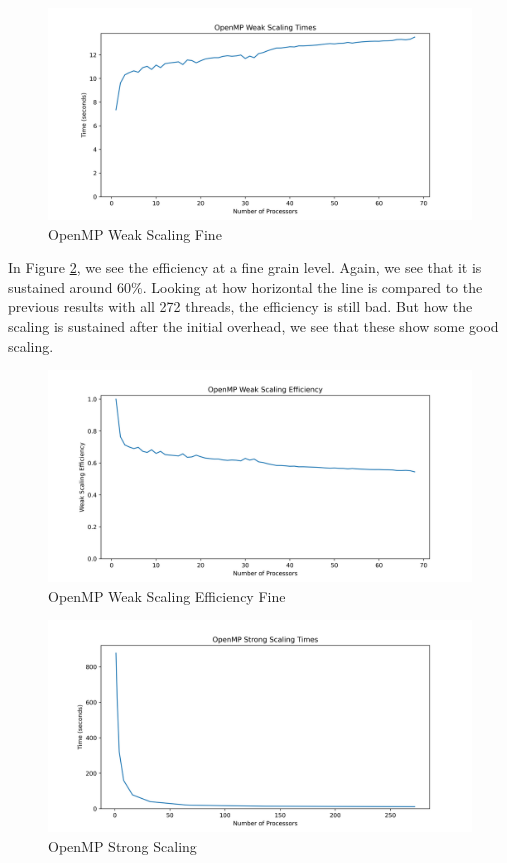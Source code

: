 \documentclass{article}
\begin{document}
\begin{figure}[H]
	\centering
	\includegraphics[width=6in]{figures/openmp_weak_scaling_times_fine.png}
	\caption{OpenMP Weak Scaling Fine}
	\label{fig:openmp-weak-scaling-fine}
\end{figure}

In Figure \ref{fig:openmp-weak-scaling-efficiency-fine}, we see the efficiency at a fine grain level. Again, we see that it is sustained around 60\%. Looking at how horizontal the line is compared to the previous results with all 272 threads, the efficiency is still bad. But how the scaling is sustained after the initial overhead, we see that these show some good scaling.

\begin{figure}[H]
	\centering
	\includegraphics[width=6in]{figures/openmp_weak_scaling_efficiency_fine.png}
	\caption{OpenMP Weak Scaling Efficiency Fine}
	\label{fig:openmp-weak-scaling-efficiency-fine}
\end{figure}

\begin{figure}[H]
	\centering
	\includegraphics[width=6in]{figures/openmp_strong_scaling_times.png}
	\caption{OpenMP Strong Scaling}
	\label{fig:openmp-strong-scaling}
\end{figure}
\end{document}
